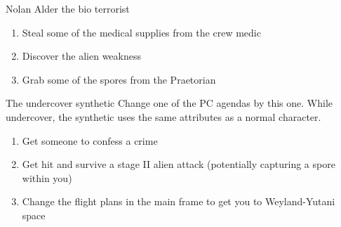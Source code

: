 \begin{rpg-commentbox}{Nolan Alder the  bio terrorist}
    \begin{enumerate}[label=\textbf{Act \arabic*}, leftmargin=1cm]
        \item Steal some of the medical supplies from the crew medic
        \item Discover the alien weakness
        \item Grab some of the spores from the Praetorian
    \end{enumerate}
\end{rpg-commentbox}

 
\begin{rpg-commentbox}{The undercover synthetic}
    Change one of the PC agendas by this one. While undercover, the synthetic uses the same attributes as a normal character.

    \begin{enumerate}[label=\textbf{Act \arabic*}, leftmargin=1cm]
        \item Get someone to confess a crime
        \item Get hit and survive a stage II alien attack (potentially capturing a spore within you)
        \item Change the flight plans in the main frame to get you to Weyland-Yutani space
    \end{enumerate}
\end{rpg-commentbox}

